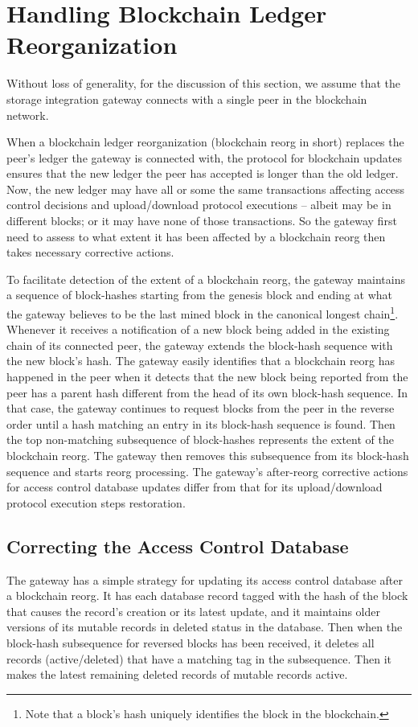 \section{Handling Blockchain Ledger Reorganization}
\label{s-gate}
Without loss of generality, for the discussion of this section, we assume that the storage integration gateway connects with a single peer in the blockchain network.  

When a blockchain ledger reorganization (blockchain reorg in short) replaces the peer's ledger the gateway is connected with, the protocol for blockchain updates ensures that the new ledger the peer has accepted is longer than the old ledger. Now, the new ledger may have all or some the same transactions affecting access control decisions and upload/download protocol executions -- albeit may be in different blocks; or it may have none of those transactions. So the gateway first need to assess to what extent it has been affected by a blockchain reorg then takes necessary corrective actions.

To facilitate detection of the extent of a blockchain reorg, the gateway maintains a sequence of block-hashes starting from the genesis block and ending at what the gateway believes to be the last mined block in the canonical longest chain\footnote{Note that a block's hash uniquely identifies the block in the blockchain.}. Whenever it receives a notification of a new block being added in the existing chain of its connected peer, the gateway extends the block-hash sequence with the new block's hash. The gateway easily identifies that a blockchain reorg has happened in the peer when it detects that the new block being reported from the peer has a parent hash different from the head of its own block-hash sequence. In that case, the gateway continues to request blocks from the peer in the reverse order until a hash matching an entry in its block-hash sequence is found. Then the top non-matching subsequence of block-hashes represents the extent of the blockchain reorg. The gateway then removes this subsequence from its block-hash sequence and starts reorg processing. The gateway's after-reorg corrective actions for access control database updates differ from that for its upload/download protocol execution steps restoration.

\subsection{Correcting the Access Control Database}              
The gateway has a simple strategy for updating its access control database after a blockchain reorg. It has each database record tagged with the hash of the block that causes the record's creation or its latest update, and it maintains older versions of its mutable records in deleted status in the database. Then when the block-hash subsequence for reversed blocks has been received, it deletes all records (active/deleted) that have a matching tag in the subsequence. Then it makes the latest remaining deleted records of mutable records active. 

